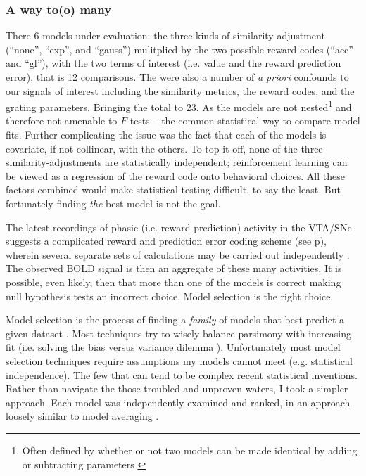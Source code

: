 \documentclass[doc,12pt]{apa}        %
\begin{document}
\subsubsection{A way to(o) many}
\label{subsub:tomany}
There 6 models under evaluation: the three kinds of similarity adjustment (``none'', ``exp'', and ``gauss'') mulitplied by the two possible reward codes (``acc'' and ``gl''), with the two terms of interest (i.e. value and the reward prediction error), that is 12 comparisons.  The were also a number of \emph{a priori} confounds to our signals of interest including the similarity metrics, the reward codes, and the grating parameters.  Bringing the total to 23.  As the models are not nested\footnote{
    Often defined by whether or not two models can be made identical by adding or subtracting parameters \cite{Forster:2000p9623}} and therefore not amenable to $F$-tests -- the common statistical way to compare model fits.  Further complicating the issue was the fact that each of the models is covariate, if not collinear, with the others.  To top it off, none of the three similarity-adjustments are statistically independent; reinforcement learning can be viewed as a regression of the reward code onto behavioral choices.  All these factors combined would make statistical testing difficult, to say the least.  But fortunately finding \emph{the} best model is not the goal.  

The latest recordings of phasic (i.e. reward prediction) activity in the VTA/SNc suggests a complicated reward and prediction error coding scheme (see p\pageref{subsub:expectations}), wherein several separate sets of calculations may be carried out independently \cite{Kim:2006p1063, Matsumoto:2009p7219, Smith:2011p8133}.  The observed BOLD signal is then an aggregate of these many activities. It is possible, even likely, then that more than one of the models is correct making null hypothesis tests an incorrect choice.  Model selection is the right choice.

Model selection is the process of finding a \emph{family} of models that best predict a given dataset \cite{Rao:2001p9457}.  Most techniques try to wisely balance parsimony with increasing fit (i.e. solving the bias versus variance dilemma \cite{Geman:1p9469}).  Unfortunately most model selection techniques require assumptions my models cannot meet (e.g. statistical independence).  The few that can tend to be complex recent statistical inventions.  Rather than navigate the those troubled and unproven waters, I took a simpler approach. Each model was independently examined and ranked, in an approach loosely similar to model averaging \cite{Forster:2000p9623}.
\end{document}
